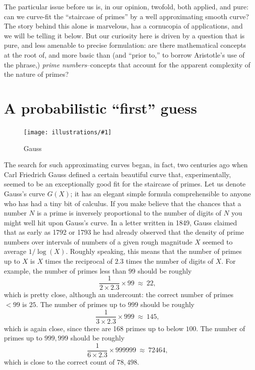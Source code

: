 \documentclass[11pt]{article}
\newcommand{\ill}[3]{ 
   \begin{figure}[H]
   \begin{center}
   \texttt{[image: illustrations/\#1]}
   \caption{#3}
   \end{center}
    \end{figure}
}
\theoremstyle{plain}
\theoremstyle{definition}
\numberwithin{equation}{section}
\numberwithin{figure}{section}
\numberwithin{table}{section}
\begin{document}
The particular issue before us is, in our opinion, twofold, both
applied, and pure: can we curve-fit the ``staircase of primes'' by a
well approximating smooth curve?  The story behind this alone is
marvelous, has a cornucopia of applications, and we will be telling it
below. But our curiosity here is driven by a question that is pure,
and less amenable to precise formulation: are there mathematical
concepts at the root of, and more basic than (and ``prior to,'' to
borrow Aristotle's use of the phrase,) {\em prime numbers}--concepts
that account for the apparent complexity of the nature of primes?
   
   
   
\section{A probabilistic ``first'' guess }

\ill{gauss}{.3}{Gauss}

The search for such approximating curves began, in fact, two centuries
ago when Carl Friedrich Gauss defined a certain beautiful curve that,
experimentally, seemed to be an exceptionally good fit for the
staircase of primes. Let us denote Gauss's curve $G(X)$; it has an
elegant simple formula comprehensible to anyone who has had a tiny bit
of calculus.  If you make believe that the chances that a number $N$ is
a prime is inversely proportional to the number of digits of $N$ you
might well hit upon Gauss's curve.   In a letter written in 1849, Gauss
claimed that as early as 1792 or 1793 he had already observed that the
density of prime numbers over intervals of numbers of a given rough
magnitude $X$ seemed to average $1/\log(X)$.  Roughly speaking, this
means that the number of primes up to $X$ is $X$ times the reciprocal 
of $2.3$ times the number of digits of $X$.  For example,
the number of primes less than $99$ should be roughly
$$
   {\frac{1}{2\times 2.3}}\times 99\ \approx \ 22,
$$   
which is pretty close, although an undercount: the correct number of
primes $< 99$ is $25$.  The number of primes up to $999$ should
be roughly
$$
   {\frac{1}{3\times 2.3}}\times 999\ \approx \ 145,
$$   
which is again close, since there are 168 primes up to below $100$. 
The number of primes up to $999,\!999$ should be roughly
$$
   {\frac{1}{6\times 2.3}}\times 999999\ \approx \ 72464,
$$   
which is close to the correct count of $78,\!498$.
\end{document}
